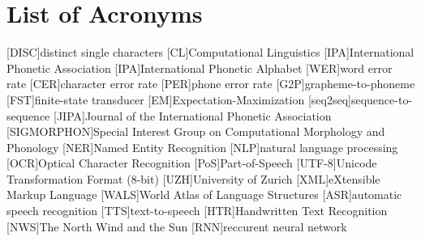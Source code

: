 {}
\chapter*{List of Acronyms}
\begin{acronym}[SIGMORPHON]\itemsep3pt
[DISC]{distinct single characters}
[CL]{Computational Linguistics}
[IPA]{International Phonetic Association}
[IPA]{International Phonetic Alphabet}
[WER]{word error rate}
[CER]{character error rate}
[PER]{phone error rate}
[G2P]{grapheme-to-phoneme}
[FST]{finite-state transducer}
[EM]{Expectation-Maximization}
[seq2seq]{sequence-to-sequence} 
[JIPA]{Journal of the International Phonetic Association}
[SIGMORPHON]{Special Interest Group on Computational  Morphology and Phonology}
[NER]{Named Entity Recognition}
[NLP]{natural language processing}
[OCR]{Optical Character Recognition}
[PoS]{Part-of-Speech}
[UTF-8]{Unicode Transformation Format (8-bit)}
[UZH]{University of Zurich}
[XML]{eXtensible Markup Language}
[WALS]{World Atlas of Language Structures}
[ASR]{automatic speech recognition}
[TTS]{text-to-speech}
[HTR]{Handwritten Text Recognition}
[NWS]{The North Wind and the Sun}
[RNN]{reccurent neural network}
\end{acronym}